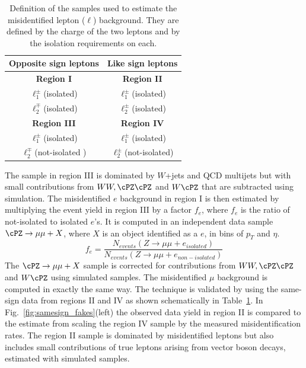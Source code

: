 \begin{table}[hbt]
 \centering
 {
 \renewcommand{\arraystretch}{1.1}
 \caption{Definition of the samples used to estimate the misidentified lepton ($\ell$) background. They
are defined by the charge of the two leptons and by the isolation requirements on each.}
  \label{tab:fakeratediagram}

  \begin{tabular}{c|c}
  Opposite sign leptons & Like sign leptons \\
  \hline
\textbf{Region I}              &  \textbf{Region II}             \\ \hline
$\ell^{\pm}_{1}$(isolated)  &  $\ell^{\pm}_{1}$(isolated)             \\
$\ell^{\mp}_{2}$(isolated)  &  $\ell^{\pm}_{2}$(isolated)             \\

\hline \hline
\textbf{Region III}           &  \textbf{Region IV}             \\ \hline
$\ell^{\pm}_{1}$(isolated)  &  $\ell^{\pm}_{1}$(isolated)             \\
$\ell^{\mp}_{2}$(not-isolated )  &  $\ell^{\pm}_{2}$(not-isolated)             \\
\hline
  \end{tabular}
}
\end{table}

The sample in region III is dominated by $W$+jets and QCD multijets but with small
contributions from $WW,\cPZ\cPZ$ and $W\cPZ$  that are subtracted using
simulation. The misidentified  $e$ background in region I is then estimated by multiplying the event yield in region III by a
factor $f_{e}$, where $f_{e}$ is the ratio
of not-isolated to isolated $e$'s. It is computed in an independent data sample $\cPZ \rightarrow \mu \mu + X$, where $X$ is an object identified as a $e$, in bins of $p_{T}$ and $\eta$.
\begin{equation}
f_{e}=\frac{ N_{events}(Z \rightarrow \mu \mu + e_{isolated}) }{N_{events}(Z \rightarrow \mu \mu + e_{non-isolated}) }
\end{equation}
The $\cPZ \rightarrow \mu \mu + X$ sample is corrected for contributions from $WW,\cPZ\cPZ$ and $W\cPZ$ using  simulated samples.
The misidentified $\mu$ background is computed in exactly the same way.
The technique is validated by using the  same-sign data from regions II and IV
as shown schematically  in Table~\ref{tab:fakeratediagram}.
In Fig.~\ref{fig:samesign_fakes}(left) the observed data yield in region II is compared
to the estimate from scaling the region IV sample
by the measured misidentification rates. The region II  sample is dominated by
misidentified leptons but also includes  small contributions of true leptons arising
from vector boson decays,  estimated with simulated samples.

